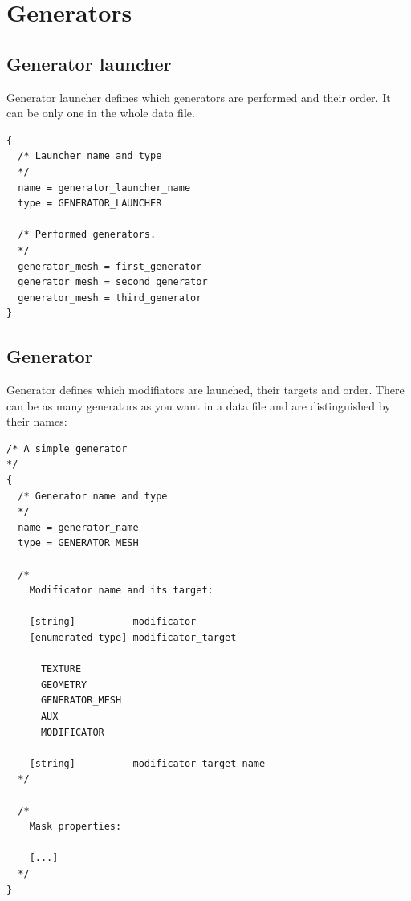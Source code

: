 \documentclass[9pt]{article}
\begin{document}
\section{Generators}

\subsection{Generator launcher}
Generator launcher defines which generators are performed and their order. 
It can be only one in the whole data file.
\begin{verbatim}
{
  /* Launcher name and type
  */
  name = generator_launcher_name
  type = GENERATOR_LAUNCHER

  /* Performed generators. 
  */
  generator_mesh = first_generator
  generator_mesh = second_generator
  generator_mesh = third_generator
}
\end{verbatim}

\subsection{Generator}
Generator defines which modifiators are launched, their targets and order. 
There can be as many generators as you want in a data file and 
are distinguished by their names:
\begin{verbatim}
/* A simple generator
*/
{
  /* Generator name and type
  */
  name = generator_name
  type = GENERATOR_MESH

  /*
    Modificator name and its target:
    
    [string]          modificator
    [enumerated type] modificator_target
      
      TEXTURE
      GEOMETRY
      GENERATOR_MESH
      AUX
      MODIFICATOR
      
    [string]          modificator_target_name
  */
  
  /*
    Mask properties:
    
    [...]  
  */
}
\end{verbatim}
\end{document}

